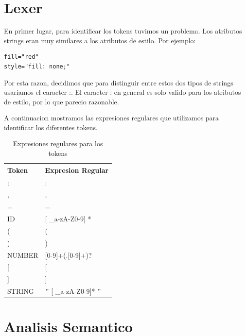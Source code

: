 \documentclass{article}
\theoremstyle{definition}
\theoremstyle{remark}
\begin{document}
\pagebreak

\section{Lexer}

En primer lugar, para identificar los tokens tuvimos un problema. Los atributos strings eran muy similares a los atributos de estilo. Por ejemplo:

\begin{verbatim}
fill="red"
style="fill: none;"
\end{verbatim}

Por esta razon, decidimos que para distinguir entre estos dos tipos de strings usariamos el caracter :. El caracter : en general es solo valido para los atributos de estilo, por lo que parecio razonable.

A continuacion mostramos las expresiones regulares que utilizamos para identificar los diferentes tokens.

\begin{table}[H]
\centering
\begin{tabular}{@{}ll@{}}
\toprule
Token & Expresion Regular \\ \midrule
: &  :\\
, &  ,\\
= &  =\\
ID &  {[} \-\_a-zA-Z0-9{]} *\\
( &  (\\
) &  )\\
NUMBER & [0-9]+(.[0-9]+)? \\
{[} & {[}\\
{]} & {]} \\
STRING &  $"$ [ \_a-zA-Z0-9]* $"$\\ \bottomrule
\end{tabular}
\caption{Expresiones regulares para los tokens}
\end{table}

%
%

\section{Analisis Semantico}
\end{document}
